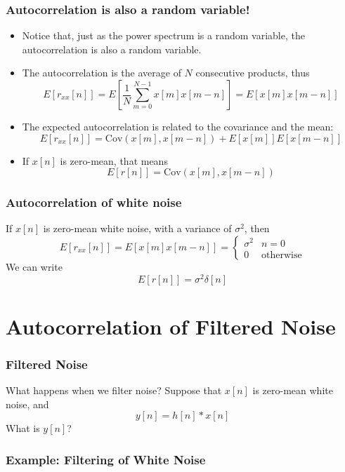 \documentclass{beamer}
\begin{document}
\begin{frame}
  \frametitle{Autocorrelation is also a random variable!}

  \begin{itemize}
    \item Notice that, just as the power spectrum is a random
      variable, the autocorrelation is also a random variable.
    \item The autocorrelation is the average of $N$ consecutive
      products, thus
      \[
      E\left[r_{xx}[n]\right] =
      E\left[\frac{1}{N}\sum_{m=0}^{N-1} x[m]x[m-n]\right]
      = E\left[x[m]x[m-n]\right]
      \]
    \item
      The expected autocorrelation is related to the covariance
      and the mean:
      \[
      E\left[r_{xx}[n]\right] =\mbox{Cov}\left(x[m],x[m-n]\right)+E\left[x[m]\right]E\left[x[m-n]\right]
      \]
    \item
      If $x[n]$ is zero-mean, that means
      \[
      E\left[r[n]\right] =\mbox{Cov}\left(x[m],x[m-n]\right)
      \]
  \end{itemize}
\end{frame}
\begin{frame}
  \frametitle{Autocorrelation of white noise}
  If $x[n]$ is zero-mean white noise, with a variance of $\sigma^2$, then
  \[
  E\left[r_{xx}[n]\right] =
  E\left[x[m]x[m-n]\right]= \begin{cases} \sigma^2 & n=0\\0 &\mbox{otherwise}\end{cases}
  \]
  We can write
  \[
  E\left[r[n]\right]=\sigma^2\delta[n]
  \]
\end{frame}

\section[Autocorrelation]{Autocorrelation of Filtered Noise}
\setcounter{subsection}{1}

\begin{frame}
  \frametitle{Filtered Noise}

  What happens when we filter noise?  Suppose that $x[n]$ is zero-mean
  white noise, and
  \[
  y[n] = h[n]\ast x[n]
  \]
  What is $y[n]$?
\end{frame}

\begin{frame}
  \frametitle{Example: Filtering of White Noise}
  
  \centerline{}
\end{frame}
\end{document}
